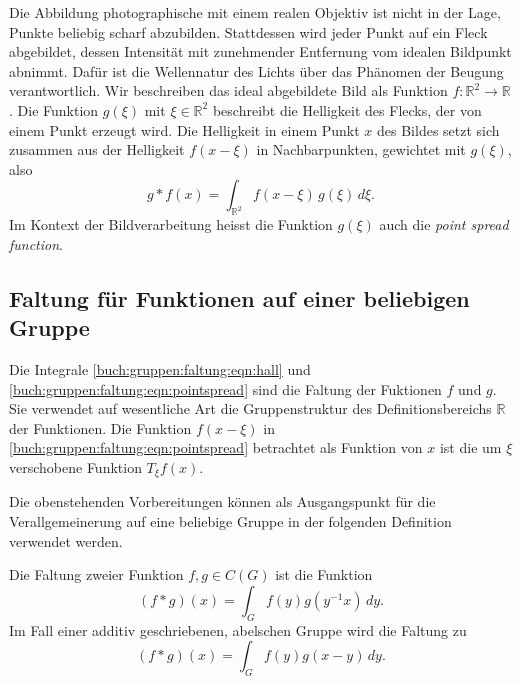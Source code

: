 Die Abbildung photographische mit einem realen Objektiv ist nicht
in der Lage, Punkte beliebig scharf abzubilden.
Stattdessen wird jeder Punkt auf ein Fleck abgebildet, dessen Intensität
mit zunehmender Entfernung vom idealen Bildpunkt abnimmt.
Dafür ist die Wellennatur des Lichts über das Phänomen der Beugung
verantwortlich.
Wir beschreiben das ideal abgebildete Bild als Funktion
$f\colon\mathbb{R}^2\to\mathbb{R}$.
Die Funktion $g(\xi)$ mit $\xi\in\mathbb{R}^2$ beschreibt die
Helligkeit des Flecks, der von einem Punkt erzeugt wird.
Die Helligkeit in einem Punkt $x$ des Bildes setzt sich zusammen
aus der Helligkeit $f(x-\xi)$ in Nachbarpunkten, gewichtet mit
$g(\xi)$, also
\begin{equation}
g*f(x)
=
\int_{\mathbb{R}^2} f(x-\xi)\,g(\xi)\,d\xi.
\label{buch:gruppen:faltung:eqn:pointspread}
\end{equation}
Im Kontext der Bildverarbeitung heisst
die Funktion $g(\xi)$ auch die {\em point spread function}.

%
%
\subsection{Faltung für Funktionen auf einer beliebigen Gruppe}
Die Integrale \eqref{buch:gruppen:faltung:eqn:hall} und
\eqref{buch:gruppen:faltung:eqn:pointspread} sind die Faltung
der Fuktionen $f$ und $g$.
Sie verwendet auf wesentliche Art die Gruppenstruktur des
Definitionsbereichs $\mathbb{R}$ der Funktionen.
Die Funktion $f(x-\xi)$ in \eqref{buch:gruppen:faltung:eqn:pointspread}
betrachtet als Funktion von $x$ ist die um $\xi$ verschobene
Funktion $T_\xi f(x)$.

Die obenstehenden Vorbereitungen können als
Ausgangspunkt für die Verallgemeinerung auf eine beliebige Gruppe
in der folgenden Definition verwendet werden.

\begin{definition}[Faltung]
Die Faltung zweier Funktion $f,g\in C(G)$ ist die Funktion
\begin{equation}
(f*g)(x)
=
\int_G f(y)g(y^{-1}x)\,dy.
\label{buch:gruppen:faltung:eqn:deffaltung}
\end{equation}
Im Fall einer additiv geschriebenen, abelschen Gruppe wird die Faltung zu
\begin{equation}
(f*g)(x)
=
\int_G f(y)g(x-y)\,dy.
\label{buch:gruppen:faltung:eqn:deffaltungadditiv}
\end{equation}
\end{definition}

